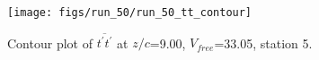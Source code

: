 \begin{figure}[H]
\centering
\texttt{[image: figs/run\_50/run\_50\_tt\_contour]}
\caption{Contour plot of $\overline{t^\prime t^\prime}$ at $z/c$=9.00, $V_{free}$=33.05, station 5.}
\label{fig:run_50_tt_contour}
\end{figure}


